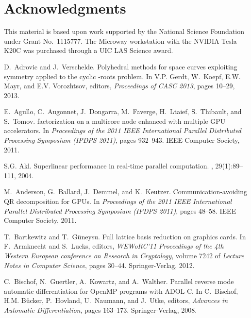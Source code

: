 \documentclass{article}
\begin{document}
\section*{Acknowledgments} 

This material is based upon work supported 
by the National Science Foundation under Grant No.\ 1115777.
The Microway workstation with the NVIDIA Tesla K20C 
was purchased through a UIC LAS Science award.





\begin{thebibliography}{10}

D.~Adrovic and J.~Verschelde.
\newblock Polyhedral methods for space curves exploiting symmetry applied to
  the cyclic -roots problem.
\newblock In V.P. Gerdt, W.~Koepf, E.W. Mayr, and E.V. Vorozhtsov, editors,
  {\em Proceedings of CASC 2013}, pages 10--29, 2013.

E.~Agullo, C.~Augonnet, J.~Dongarra, M.~Faverge, H.~Ltaief, S.~Thibault, and
  S.~Tomov.
 factorization on a multicore node enhanced with multiple {GPU}
  accelerators.
\newblock In {\em Proceedings of the 2011 IEEE International Parallel
  Distributed Processing Symposium (IPDPS 2011)}, pages 932--943. IEEE Computer
  Society, 2011.

S.G. Akl.
\newblock Superlinear performance in real-time parallel computation.
, 29(1):89--111, 2004.

M.~Anderson, G.~Ballard, J.~Demmel, and K.~Keutzer.
\newblock Communication-avoiding {QR} decomposition for {GPU}s.
\newblock In {\em Proceedings of the 2011 IEEE International Parallel
  Distributed Processing Symposium (IPDPS 2011)}, pages 48--58. IEEE Computer
  Society, 2011.

T.~Bartkewitz and T.~G{\"{u}}neysu.
\newblock Full lattice basis reduction on graphics cards.
\newblock In F.~Armknecht and S.~Lucks, editors, {\em WEWoRC'11 Proceedings of
  the 4th Western European conference on Research in Cryptology}, volume 7242
  of {\em Lecture Notes in Computer Science}, pages 30--44. Springer-Verlag,
  2012.

C.~Bischof, N.~Guertler, A.~Kowartz, and A.~Walther.
\newblock Parallel reverse mode automatic differentiation for {OpenMP} programs
  with {ADOL-C}.
\newblock In C.~Bischof, H.M. B{\"{u}}cker, P.~Hovland, U.~Naumann, and
  J.~Utke, editors, {\em Advances in Automatic Differentiation}, pages
  163--173. Springer-Verlag, 2008.


\end{thebibliography}
\end{document}

